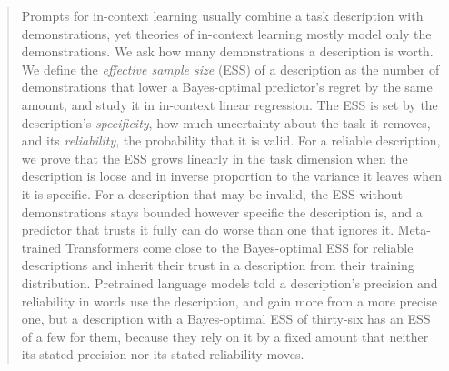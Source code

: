 \documentclass{article}
\begin{document}
\printAffiliationsAndNotice{}

\begin{abstract}
Prompts for in-context learning usually combine a task description with demonstrations, yet theories of in-context learning mostly model only the demonstrations. We ask how many demonstrations a description is worth. We define the \emph{effective sample size} (ESS) of a description as the number of demonstrations that lower a Bayes-optimal predictor's regret by the same amount, and study it in in-context linear regression. The ESS is set by the description's \emph{specificity}, how much uncertainty about the task it removes, and its \emph{reliability}, the probability that it is valid. For a reliable description, we prove that the ESS grows linearly in the task dimension when the description is loose and in inverse proportion to the variance it leaves when it is specific. For a description that may be invalid, the ESS without demonstrations stays bounded however specific the description is, and a predictor that trusts it fully can do worse than one that ignores it. Meta-trained Transformers come close to the Bayes-optimal ESS for reliable descriptions and inherit their trust in a description from their training distribution. Pretrained language models told a description's precision and reliability in words use the description, and gain more from a more precise one, but a description with a Bayes-optimal ESS of thirty-six has an ESS of a few for them, because they rely on it by a fixed amount that neither its stated precision nor its stated reliability moves.
\end{abstract}
\end{document}
